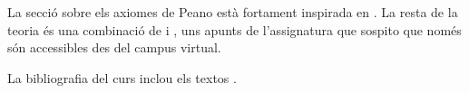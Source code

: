 \documentclass[../Apunts.tex]{subfiles}
\begin{document}
	\printbibliography
	La secció sobre els axiomes de Peano està fortament inspirada en \cite{notesKumar}. La resta de la teoria és una combinació de \cite{AntoineRosaCampsMoncasiIntroduccioAlgebraAbstracta} i \cite{TemesFonaments}, uns apunts de l'assignatura que sospito que només són accessibles des del campus virtual.
	
	La bibliografia del curs inclou els textos \cite{AntoineRosaCampsMoncasiIntroduccioAlgebraAbstracta,CastelletLlerenaAlgebraLinealIGeometria,GodementAlgebra,NutsAndBoltsOfProofs,BujalanceBujalanceCostaProblemasMatematicaDiscreta,IntroductionToMathematicalReasoning,ChapterZeroSchumacher}.
\end{document}
